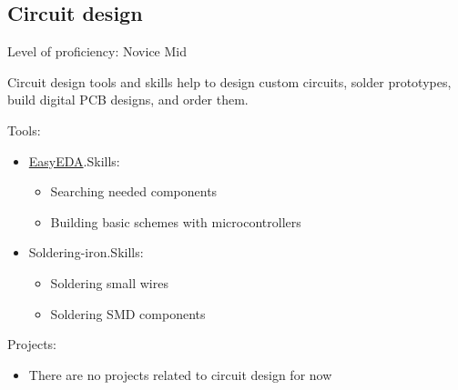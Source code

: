 \subsection{Circuit design}

Level of proficiency: Novice Mid

\vintent

Circuit design tools and skills help to design custom circuits,
solder prototypes, build digital PCB designs, and order them.

\vintent

Tools:
\begin{itemize}
    \item \href{https://github.com/dkushche/EasyEDA}{EasyEDA}.\break Skills:
    \begin{itemize}
        \item Searching needed components
        \item Building basic schemes with microcontrollers
    \end{itemize}
    \item Soldering-iron.\break Skills:
    \begin{itemize}
        \item Soldering small wires
        \item Soldering SMD components
    \end{itemize}
\end{itemize}

\vintent

Projects:
\begin{itemize}
    \item There are no projects related to circuit design for now
\end{itemize}
